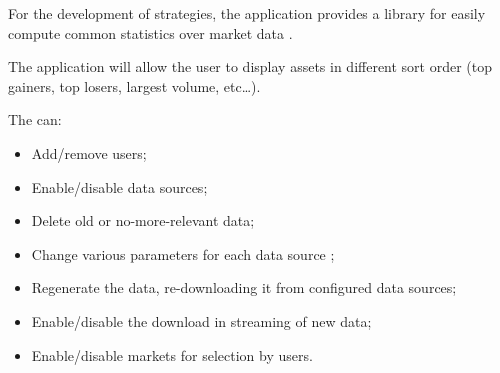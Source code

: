 For the development of strategies, the application provides a library for easily
compute common statistics over market data .

The application will allow the user to display assets in different sort order
(top gainers, top losers, largest volume, etc\ldots).

The  can:

\begin{itemize}
	\item Add/remove users;
	\item Enable/disable data sources;
	\item Delete old or no-more-relevant data;
	\item Change various parameters for each data source ;
	\item Regenerate the data, re-downloading it from configured data
		sources;
	\item Enable/disable the download in streaming of new data;
	\item Enable/disable markets for selection by users.
\end{itemize}
